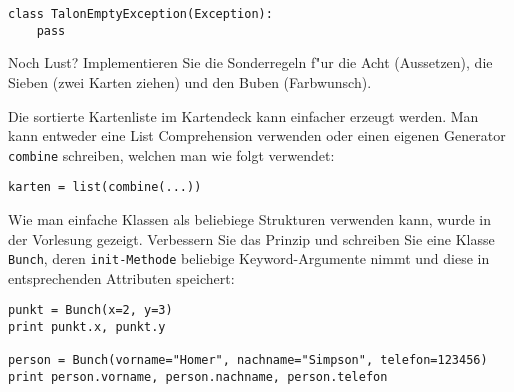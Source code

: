 \begin{aufgabe}[MauMau]
\begin{teilaufgabe}[Grundlagen]
\begin{lstlisting}
class TalonEmptyException(Exception):
    pass
\end{lstlisting}
\end{teilaufgabe}
\begin{teilaufgabe}[Spezialkarten]
Noch Lust? Implementieren Sie die Sonderregeln f"ur die Acht (Aussetzen), die Sieben (zwei Karten ziehen) und den Buben (Farbwunsch).
\end{teilaufgabe}
\begin{teilaufgabe}[F"ur Profis]
Die sortierte Kartenliste im Kartendeck kann einfacher erzeugt werden. Man kann entweder eine List Comprehension verwenden oder einen eigenen Generator \lstinline{combine} schreiben, welchen man wie folgt verwendet:
\begin{lstlisting}
karten = list(combine(...))
\end{lstlisting}
\end{teilaufgabe}
\end{aufgabe}

\begin{aufgabe}[F"ur Profis]
Wie man einfache Klassen als beliebiege Strukturen verwenden kann, wurde in der Vorlesung gezeigt. Verbessern Sie das Prinzip und schreiben Sie eine Klasse \lstinline{Bunch}, deren \lstinline{init-Methode} beliebige Keyword-Argumente nimmt und diese in entsprechenden Attributen speichert:
\begin{lstlisting}
punkt = Bunch(x=2, y=3)
print punkt.x, punkt.y

person = Bunch(vorname="Homer", nachname="Simpson", telefon=123456)
print person.vorname, person.nachname, person.telefon
\end{lstlisting}
\end{aufgabe}


